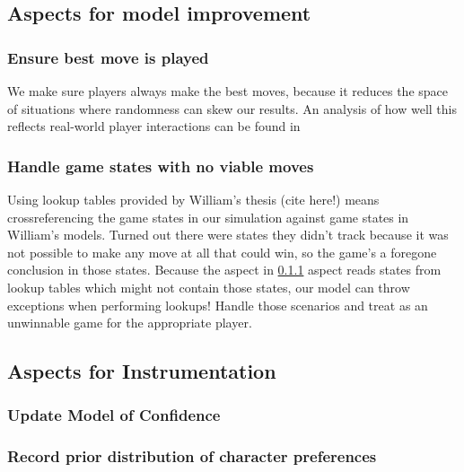 \subsection{Aspects for model improvement}

\subsubsection{Ensure best move is played}\label{subsubsec:ensure_best_move}

We make sure players always make the best moves, because it reduces the space of
situations where randomness can skew our results. An analysis of how well this
reflects real-world player interactions can be found in 

\subsubsection{Handle game states with no viable moves}

Using lookup tables provided by William's thesis (cite here!) means
crossreferencing the game states in our simulation against game states in
William's models. Turned out there were states they didn't track because it was
not possible to make any move at all that could win, so the game's a foregone
conclusion in those states. Because the aspect in
\cref{subsubsec:ensure_best_move} aspect reads states from lookup tables which
might not contain those states, our model can throw exceptions when performing
lookups! Handle those scenarios and treat as an unwinnable game for the
appropriate player.


\subsection{Aspects for Instrumentation}

\subsubsection{Update Model of Confidence}

\subsubsection{Record prior distribution of character preferences}

